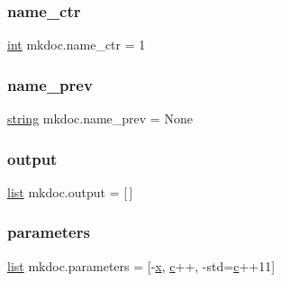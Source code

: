 \mbox{\label{namespacemkdoc_a9dd4ab426bd81d51c31af8f18171b3c5}} 
\subsubsection{\texorpdfstring{name\_ctr}{name\_ctr}}
{\footnotesize\ttfamily \mbox{\hyperlink{warnings_8h_a74f207b5aa4ba51c3a2ad59b219a423b}{int}} mkdoc.\+name\+\_\+ctr = 1}

\mbox{\label{namespacemkdoc_a029677ada5b49414de07f350a8f3f657}} 
\subsubsection{\texorpdfstring{name\_prev}{name\_prev}}
{\footnotesize\ttfamily \mbox{\hyperlink{asdl_8h_ae84541b4f3d8e1ea24ec0f466a8c568b}{string}} mkdoc.\+name\+\_\+prev = None}

\mbox{\label{namespacemkdoc_a6299c53cb772acb4a1cb315a21268404}} 
\subsubsection{\texorpdfstring{output}{output}}
{\footnotesize\ttfamily \mbox{\hyperlink{classlist}{list}} mkdoc.\+output = \mbox{[}$\,$\mbox{]}}

\mbox{\label{namespacemkdoc_a2cff62850018cb669b1d13bb8c335018}} 
\subsubsection{\texorpdfstring{parameters}{parameters}}
{\footnotesize\ttfamily \mbox{\hyperlink{classlist}{list}} mkdoc.\+parameters = \mbox{[}\textquotesingle{}-\/\mbox{\hyperlink{_s_d_l__opengl_8h_ad0e63d0edcdbd3d79554076bf309fd47}{x}}\textquotesingle{}, \textquotesingle{}\mbox{\hyperlink{_s_d_l__opengl__glext_8h_a1f2d7f8147412c43ba2303a56f97ee73}{c}}++\textquotesingle{}, \textquotesingle{}-\/std=\mbox{\hyperlink{_s_d_l__opengl__glext_8h_a1f2d7f8147412c43ba2303a56f97ee73}{c}}++11\textquotesingle{}\mbox{]}}

